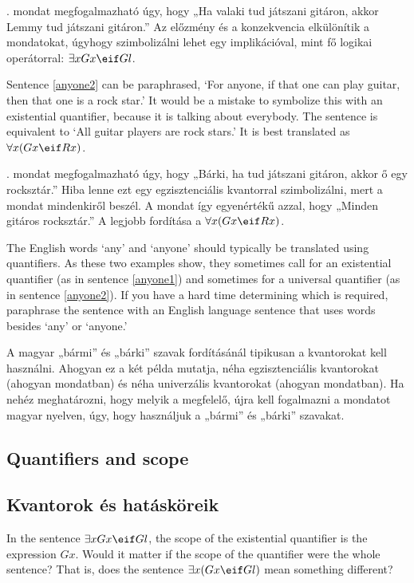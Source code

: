 . mondat megfogalmazható úgy, hogy „Ha valaki tud játszani gitáron, akkor Lemmy tud játszani gitáron.” Az előzmény és a konzekvencia elkülönítik a mondatokat, úgyhogy szimbolizálni lehet egy implikációval, mint fő logikai operátorral: $\exists x Gx \eif Gl$.


Sentence \ref{anyone2} can be paraphrased, `For anyone, if that one can play guitar, then that one is a rock star.' It would be a mistake to symbolize this with an existential quantifier, because it is talking about everybody. The sentence is equivalent to `All guitar players are rock stars.' It is best translated as $\forall x(Gx \eif Rx)$.

. mondat megfogalmazható úgy, hogy „Bárki, ha tud játszani gitáron, akkor ő egy rocksztár.” Hiba lenne ezt egy egzisztenciális kvantorral szimbolizálni, mert a mondat mindenkiről beszél. A mondat így egyenértékű azzal, hogy „Minden gitáros rocksztár.” A legjobb fordítása a $\forall x(Gx \eif Rx)$. 


The English words `any' and `anyone' should typically be translated using quantifiers. As these two examples show, they sometimes call for an existential quantifier (as in sentence \ref{anyone1}) and sometimes for a universal quantifier (as in sentence \ref{anyone2}). If you have a hard time determining which is required, paraphrase the sentence with an English language sentence that uses words besides `any' or `anyone.'

A magyar „bármi” és „bárki” szavak fordításánál tipikusan a kvantorokat kell használni. Ahogyan ez a két példa mutatja, néha egzisztenciális kvantorokat (ahogyan  mondatban) és néha univerzális kvantorokat (ahogyan  mondatban). Ha nehéz meghatározni, hogy melyik a megfelelő, újra kell fogalmazni a mondatot magyar nyelven, úgy, hogy használjuk a „bármi” és „bárki” szavakat. 


\subsection*{Quantifiers and scope}
\subsection{Kvantorok és hatásköreik}


In the sentence $\exists x Gx \eif Gl$, the scope of the existential quantifier is the expression $Gx$. Would it matter if the scope of the quantifier were the whole sentence? That is, does the sentence $\exists x (Gx \eif Gl)$ mean something different?

